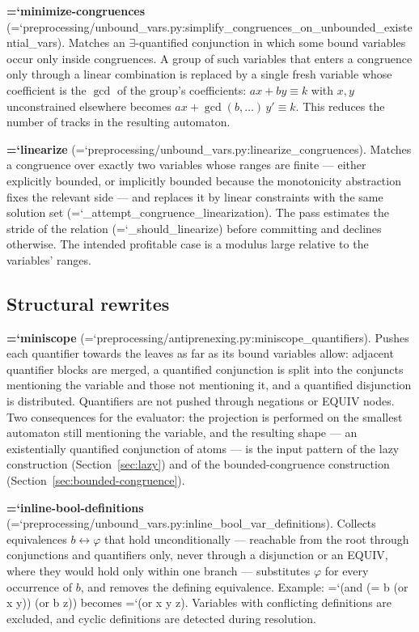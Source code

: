 \documentclass[10pt,a4paper]{article}
\newcommand{\code}[1]{{\small\ttfamily\hyphenchar\font=`\-\relax #1}}
\begin{document}
\textbf{\code{minimize-congruences}}
(\code{preprocessing/unbound\_\allowbreak vars.py:\allowbreak simplify\_\allowbreak congruences\_\allowbreak on\_\allowbreak unbounded\_\allowbreak existential\_\allowbreak vars}).
Matches an $\exists$-quantified conjunction in which some bound variables occur only inside
congruences.  A group of such variables that enters a congruence only through a linear combination is
replaced by a single fresh variable whose coefficient is the $\gcd$ of the group's coefficients:
$a x + b y \equiv k$ with $x, y$ unconstrained elsewhere becomes
$a x + \gcd(b, \dots)\, y' \equiv k$.  This reduces the number of tracks in the resulting automaton.

\textbf{\code{linearize}} (\code{preprocessing/unbound\_\allowbreak vars.py:\allowbreak linearize\_\allowbreak congruences}).  Matches a
congruence over exactly two variables whose ranges are finite --- either explicitly bounded, or
implicitly bounded because the monotonicity abstraction fixes the relevant side --- and replaces it by
linear constraints with the same solution set (\code{\_\allowbreak attempt\_\allowbreak congruence\_\allowbreak linearization}).  The pass
estimates the stride of the relation (\code{\_should\_linearize}) before committing and declines
otherwise.  The intended profitable case is a modulus large relative to the variables' ranges.

\subsection{Structural rewrites}

\textbf{\code{miniscope}} (\code{preprocessing/antiprenexing.py:\allowbreak miniscope\_\allowbreak quantifiers}).  Pushes each
quantifier towards the leaves as far as its bound variables allow: adjacent quantifier blocks are
merged, a quantified conjunction is split into the conjuncts mentioning the variable and those not
mentioning it, and a quantified disjunction is distributed.  Quantifiers are not pushed through
negations or EQUIV nodes.  Two consequences for the evaluator: the projection is performed on the
smallest automaton still mentioning the variable, and the resulting shape --- an existentially
quantified conjunction of atoms --- is the input pattern of the lazy construction
(Section~\ref{sec:lazy}) and of the bounded-congruence construction
(Section~\ref{sec:bounded-congruence}).

\textbf{\code{inline-bool-definitions}}
(\code{preprocessing/unbound\_\allowbreak vars.py:\allowbreak inline\_\allowbreak bool\_\allowbreak var\_\allowbreak definitions}).  Collects equivalences
$b \leftrightarrow \varphi$ that hold unconditionally --- reachable from the root through conjunctions
and quantifiers only, never through a disjunction or an EQUIV, where they would hold only within one
branch --- substitutes $\varphi$ for every occurrence of $b$, and removes the defining equivalence.
Example: \code{(and (= b (or x y)) (or b z))} becomes \code{(or x y z)}.  Variables with conflicting
definitions are excluded, and cyclic definitions are detected during resolution.
\end{document}
